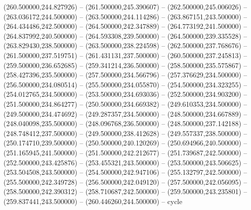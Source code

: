    (260.500000,244.827926) -- (261.500000,245.390607) -- (262.500000,245.006026) -- (263.036172,244.500000) -- (263.500000,244.114286) -- (263.867151,243.500000) -- (264.434486,242.500000) -- (264.500000,242.347889) -- (264.773192,241.500000) -- (264.837992,240.500000) -- (264.593308,239.500000) -- (264.500000,239.335528) -- (263.829430,238.500000) -- (263.500000,238.224598) -- (262.500000,237.768676) -- (261.500000,237.519751) -- (261.431131,237.500000) -- (260.500000,237.245813) -- (259.500000,236.652685) -- (259.341214,236.500000) -- (258.500000,235.575867) -- (258.427396,235.500000) -- (257.500000,234.566796) -- (257.376629,234.500000) -- (256.500000,234.080514) -- (255.500000,234.055870) -- (254.500000,234.323255) -- (254.012765,234.500000) -- (253.500000,234.693036) -- (252.500000,234.903200) -- (251.500000,234.864277) -- (250.500000,234.669382) -- (249.610353,234.500000) -- (249.500000,234.474692) -- (249.287357,234.500000) -- (248.500000,234.667889) -- (248.040098,235.500000) -- (248.096768,236.500000) -- (248.500000,237.142188) -- (248.748412,237.500000) -- (249.500000,238.412628) -- (249.557337,238.500000) -- (250.174710,239.500000) -- (250.500000,240.120269) -- (250.694966,240.500000) -- (251.165945,241.500000) -- (251.500000,242.212677) -- (251.739687,242.500000) -- (252.500000,243.425876) -- (253.455321,243.500000) -- (253.500000,243.506625) -- (253.504508,243.500000) -- (254.500000,242.947106) -- (255.132797,242.500000) -- (255.500000,242.349728) -- (256.500000,242.049120) -- (257.500000,242.056095) -- (258.500000,242.390312) -- (258.710687,242.500000) -- (259.500000,243.235801) -- (259.837441,243.500000) -- (260.446260,244.500000) -- cycle
